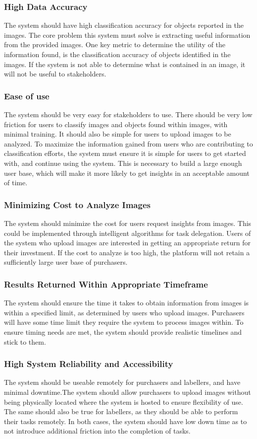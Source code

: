 \documentclass[12pt]{article}
\begin{document}
\subsubsection*{High Data Accuracy}
The system should have high classification accuracy for objects reported in the images. The core problem this system must solve is extracting useful information from the provided images.
 One key metric to determine the utility of the information found, is the classification accuracy of objects identified in the images. If the system is 
 not able to determine what is contained in an image, it will not be useful to stakeholders.
\subsubsection*{Ease of use}
The system should be very easy for stakeholders to use. There should be very low friction for users to classify images and objects found
within images, with minimal training. It should also be simple for users to upload images to be analyzed. To maximize the information gained from users who are contributing to classification efforts, the system must ensure it is simple for users to 
get started with, and continue using the system. This is necessary to build a large enough user base, which will make it more likely to get insights in an acceptable 
amount of time.
\subsubsection*{Minimizing Cost to Analyze Images}
The system should minimize the cost for users request insights from images. This could be implemented through intelligent algorithms for task delegation. Users of the system who upload images are interested in getting an appropriate return for their investment. If the cost to analyze is too high, the platform will not
retain a sufficiently large user base of purchasers.
\subsubsection*{Results Returned Within Appropriate Timeframe}
The system should ensure the time it takes to obtain information from images is within a specified limit, as determined by users who upload images. Purchasers will have some time limit they require the system to process images within. To ensure timing needs are met, the system should provide realistic timelines and stick to them.
\subsubsection*{High System Reliability and Accessibility}
The system should be useable remotely for purchasers and labellers, and have minimal downtime.The system should allow purchasers to upload images without being physically located where the system is hosted to ensure flexibility of use. The same should also be true for labellers, as they 
should be able to perform their tasks remotely. In both cases, the system should have low down time as to not introduce additional friction into the completion of tasks.
\end{document}
